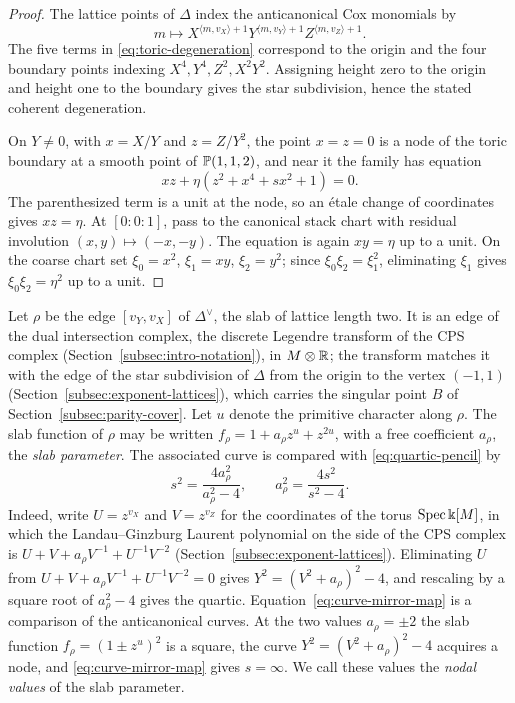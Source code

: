 \begin{proof}
The lattice points of $\Delta$ index the anticanonical Cox monomials by
\[
 m\longmapsto
 X^{\langle m,v_X\rangle+1}
 Y^{\langle m,v_Y\rangle+1}
 Z^{\langle m,v_Z\rangle+1}.
\]
The five terms in \eqref{eq:toric-degeneration} correspond to the origin and
the four boundary points indexing $X^4,Y^4,Z^2,X^2Y^2$.  Assigning height
zero to the origin and height one to the boundary gives the star
subdivision, hence the stated coherent degeneration.

On $Y\ne0$, with $x=X/Y$ and $z=Z/Y^2$, the point $x=z=0$ is a node of
the toric boundary at a smooth point of $\mathbb P(1,1,2)$, and near it the family
has equation
\[
 xz+\eta(z^2+x^4+sx^2+1)=0.
\]
The parenthesized term is a unit at the node, so an étale change of
coordinates gives $xz=\eta$.  At $[0:0:1]$, pass to the canonical stack chart
with residual involution $(x,y)\mapsto(-x,-y)$.  The equation is again
$xy=\eta$ up to a unit.  On the coarse chart set
$\xi_0=x^2$, $\xi_1=xy$, $\xi_2=y^2$; since $\xi_0\xi_2=\xi_1^2$,
eliminating $\xi_1$ gives $\xi_0\xi_2=\eta^2$ up to a unit.
\end{proof}

Let $\rho$ be the edge $[v_Y,v_X]$ of $\Delta^\vee$, the slab of lattice
length two.  It is an edge of the dual intersection complex, the
discrete Legendre transform of the CPS complex
(Section~\ref{subsec:intro-notation}), in $M\otimes\mathbb R$; the transform matches it with the edge of the star
subdivision of $\Delta$ from the origin to the vertex $(-1,1)$
(Section~\ref{subsec:exponent-lattices}), which carries the singular point
$B$ of Section~\ref{subsec:parity-cover}.  Let $u$ denote the primitive
character along $\rho$.  The slab function of $\rho$ may be written $f_\rho=1+a_\rho z^u+z^{2u}$, with a
free coefficient $a_\rho$, the \emph{slab parameter}.  The associated curve is
compared with
\eqref{eq:quartic-pencil} by
\begin{equation}\label{eq:curve-mirror-map}
 s^2=\frac{4a_\rho^2}{a_\rho^2-4},
 \qquad a_\rho^2=\frac{4s^2}{s^2-4}.
\end{equation}
Indeed, write $U=z^{v_X}$ and $V=z^{v_Z}$ for the coordinates of the torus
$\operatorname{Spec}\Bbbk[M]$, in which the Landau--Ginzburg Laurent polynomial on the
side of the CPS complex is $U+V+a_\rho V^{-1}+U^{-1}V^{-2}$
(Section~\ref{subsec:exponent-lattices}).  Eliminating $U$ from
$U+V+a_\rho V^{-1}+U^{-1}V^{-2}=0$ gives
$Y^2=(V^2+a_\rho)^2-4$, and rescaling by a square root of $a_\rho^2-4$ gives the
quartic.  Equation~\eqref{eq:curve-mirror-map} is a comparison of the
anticanonical curves.  At the two values $a_\rho=\pm2$ the slab function
$f_\rho=(1\pm z^u)^2$ is a square, the curve $Y^2=(V^2+a_\rho)^2-4$ acquires a
node, and \eqref{eq:curve-mirror-map} gives $s=\infty$.  We call these
values the \emph{nodal values} of the slab parameter.

